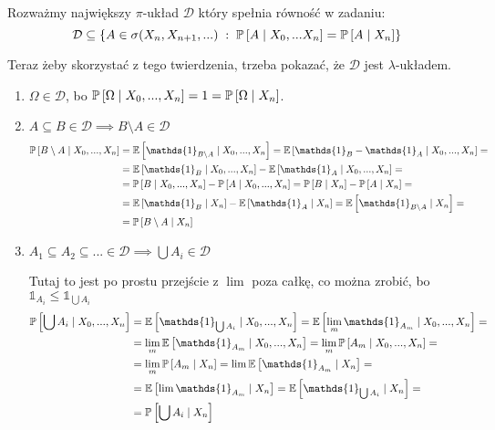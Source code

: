 \begin{solution}
  Rozważmy największy $\pi$-układ $\mathcal{D}$ który spełnia równość w zadaniu:
  $$\mathcal{D}\subseteq\{A\in\sigma(X_n, X_{n+1},...)\;:\;\prob{A}{X_0,... X_n}=\prob{A}{X_n}\}$$

  Teraz żeby skorzystać z tego twierdzenia, trzeba pokazać, że $\mathcal{D}$ jest $\lambda$-układem.
  \begin{enumerate}
    \item $\Omega\in \mathcal{D}$, bo $\prob{\Omega}{X_0,..., X_n}=1=\prob{\Omega}{X_n}$.
    \item $A\subseteq B\in\mathcal{D}\implies B\setminus A\in\mathcal{D}$
      \begin{align*}
        \prob{B\setminus A}{X_0,..., X_n}&=\expected{\mathds{1}_{B\setminus A}}{X_0,..., X_n}=\expected{\mathds{1}_B-\mathds{1}_A}{X_0,..., X_n}=\\ 
                                         &=\expected{\mathds{1}_B}{X_0,..., X_n}-\expected{\mathds{1}_A}{X_0,..., X_n}=\\ 
                                         &=\prob{B}{X_0,..., X_n}-\prob{A}{X_0,..., X_n}=\prob{B}{X_n}-\prob{A}{X_n}=\\ 
                                         &=\expected{\mathds{1}_B}{X_n}-\expected{\mathds{1}_A}{X_n}=\expected{\mathds{1}_{B\setminus A}}{X_n}=\\ 
                                         &=\prob{B\setminus A}{X_n}
      \end{align*}
    \item $A_1\subseteq A_2\subseteq... \in\mathcal{D}\implies \bigcup A_i\in \mathcal{D}$
      
      Tutaj to jest po prostu przejście z $\lim$ poza całkę, co można zrobić, bo $\mathds{1}_{A_i}\leq \mathds{1}_{\bigcup A_i}$
      \begin{align*}
        \prob{\bigcup A_i}{X_0,..., X_n}&=\expected{\mathds{1}_{\bigcup A_i} }{X_0,..., X_n}= \expected{\lim_m\mathds{1}_{A_m}}{X_0,...,X_n}=\\ 
                                        &=\lim_m\expected{\mathds{1}_{A_m}}{X_0,..., X_n}=\lim_m\prob{A_m}{X_0,...,X_n}=\\ 
                                        &=\lim_m\prob{A_m}{X_n}=\lim\expected{\mathds{1}_{A_m}}{X_n}=\\ 
                                        &=\expected{\lim \mathds{1}_{A_m}}{X_n}=\expected{\mathds{1}_{\bigcup A_i}}{X_n}=\\ 
                                        &=\prob{\bigcup A_i}{X_n}
      \end{align*}
  \end{enumerate}
\end{solution}
